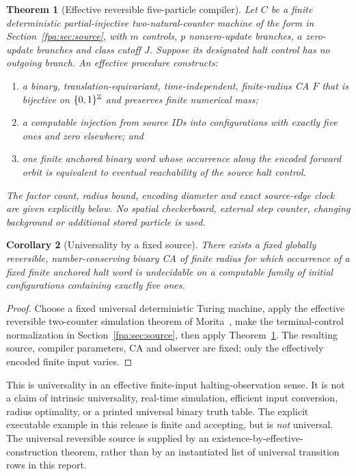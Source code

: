 \documentclass[11pt,a4paper]{article}
\numberwithin{equation}{section}
\newtheorem{theorem}{Theorem}[section]
\newtheorem{corollary}[theorem]{Corollary}
\begin{document}
\begin{theorem}[Effective reversible five-particle compiler]\label{fpa:thm:main}
Let $C$ be a finite deterministic partial-injective two-natural-counter machine
of the form in Section~\ref{fpa:sec:source}, with $m$ controls, $p$ nonzero-update
branches, $a$ zero-update branches and class cutoff $J$. Suppose its designated
halt control has no outgoing branch. An effective procedure constructs:
\begin{enumerate}
\item a binary, translation-equivariant, time-independent, finite-radius CA
$F$ that is bijective on $\{0,1\}^{\mathbb Z}$ and preserves finite numerical mass;
\item a computable injection from source IDs into configurations with exactly
five ones and zero elsewhere; and
\item one finite anchored binary word whose occurrence along the encoded
forward orbit is equivalent to eventual reachability of the source halt
control.
\end{enumerate}
The factor count, radius bound, encoding diameter and exact source-edge clock
are given explicitly below. No spatial checkerboard, external step counter,
changing background or additional stored particle is used.
\end{theorem}

\begin{corollary}[Universality by a fixed source]\label{fpa:cor:universal}
There exists a fixed globally reversible, number-conserving binary CA of finite
radius for which occurrence of a fixed finite anchored halt word is undecidable
on a computable family of initial configurations containing exactly five ones.
\end{corollary}
\begin{proof}
Choose a fixed universal deterministic Turing machine, apply the effective
reversible two-counter simulation theorem of Morita~\cite{fpa:morita1996}, make the
terminal-control normalization in Section~\ref{fpa:sec:source}, then apply
Theorem~\ref{fpa:thm:main}. The resulting source, compiler parameters, CA and observer
are fixed; only the effectively encoded finite input varies.
\end{proof}

This is universality in an effective finite-input halting-observation sense.
It is not a claim of intrinsic universality, real-time simulation, efficient
input conversion, radius optimality, or a printed universal binary truth table.
The explicit executable example in this release is finite and accepting, but
is \emph{not} universal. The universal reversible source is supplied by an
existence-by-effective-construction theorem, rather than by an instantiated
list of universal transition rows in this report.
\end{document}
